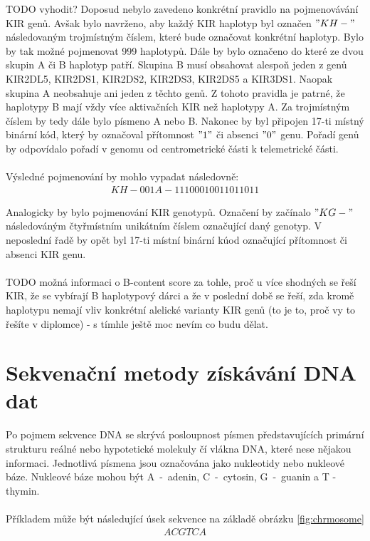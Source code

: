 \documentclass[czech,DP]{thesiskiv}
\numberwithin{equation}{section}
\begin{document}
TODO vyhodit?
\noindent
Doposud nebylo zavedeno konkrétní pravidlo na pojmenovávání KIR genů. Avšak bylo navrženo, aby každý KIR haplotyp byl označen $"KH-"$ následovaným trojmístným číslem, které bude označovat konkrétní haplotyp. Bylo by tak možné pojmenovat 999 haplotypů. Dále by bylo označeno do které ze dvou skupin A či B haplotyp patří. Skupina B musí obsahovat alespoň jeden z genů KIR2DL5, KIR2DS1, KIR2DS2, KIR2DS3, KIR2DS5 a KIR3DS1. Naopak skupina A neobsahuje ani jeden z těchto genů. Z tohoto pravidla je patrné, že haplotypy B mají vždy více aktivačních KIR než haplotypy A. Za trojmístným číslem by tedy dále bylo písmeno A nebo B. Nakonec by byl připojen 17-ti místný binární kód, který by označoval přítomnost $"1"$ či absenci $"0"$ genu. Pořadí genů by odpovídalo pořadí v genomu od centrometrické části k telemetrické části. \cite{imgt_hla_database}
\\
\\
Výsledné pojmenování by mohlo vypadat následovně:
\begin{align}
   \label{kir_haplotyp} KH-001A-11100010011011011
\end{align}

\noindent
Analogicky by bylo pojmenování KIR genotypů. Označení by začínalo \mbox{$"KG-"$} následováným čtyřmístním unikátním číslem označující daný genotyp. V neposlední řadě by opět byl 17-ti místní binární kúod označující přítomnost či absenci KIR genu.
\\
\\
TODO možná informaci o B-content score za tohle, proč u více shodných se řeší KIR, že se vybírají B haplotypový dárci a že v poslední době se řeší, zda kromě haplotypu nemají vliv konkrétní alelické varianty KIR genů (to je to, proč vy to řešíte v diplomce) - s tímhle ještě moc nevím co budu dělat.


\chapter{Sekvenační metody získávání DNA dat}
Po pojmem sekvence DNA se skrývá posloupnost písmen představujících primární strukturu reálné nebo hypotetické molekuly čí vlákna DNA, které nese nějakou informaci. Jednotlivá písmena jsou označována jako nukleotidy nebo nukleové báze. Nukleové báze mohou být A~-~adenin, C~-~cytosin, G~-~guanin a T - thymin. \cite{genome_gov}
\\
\\
\noindent
Příkladem může být následující úsek sekvence na základě obrázku \ref{fig:chrmosome} 
\begin{align}
   \label{sekvence_prikad} ACGTCA
\end{align}
\end{document}
